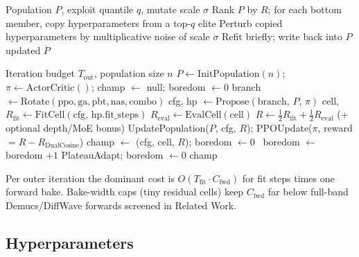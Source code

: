 \begin{algorithm}[t]
\caption{PBT exploit--mutate}
\label{alg:pbt}
\begin{algorithmic}[1]
\Require Population $P$, exploit quantile $q$, mutate scale $\sigma$
\State Rank $P$ by $R$; for each bottom member, copy hyperparameters from a top-$q$ elite
\State Perturb copied hyperparameters by multiplicative noise of scale $\sigma$
\State Refit briefly; write back into $P$
\State \Return updated $P$
\end{algorithmic}
\end{algorithm}

\begin{algorithm}[t]
\caption{HybridMetaSearch}
\label{alg:hybrid}
\begin{algorithmic}[1]
\Require Iteration budget $T_{\mathrm{out}}$, population size $n$
\State $P \gets \mathrm{InitPopulation}(n)$; $\pi \gets \mathrm{ActorCritic}()$; champ $\gets$ null; boredom $\gets 0$
  \State branch $\gets \mathrm{Rotate}(\mathrm{ppo},\mathrm{ga},\mathrm{pbt},\mathrm{nas},\mathrm{combo})$
  \State cfg, hp $\gets \mathrm{Propose}(\mathrm{branch},\,P,\,\pi)$
  \State cell, $R_{\mathrm{fit}} \gets \mathrm{FitCell}(\mathrm{cfg},\,\mathrm{hp.fit\_steps})$
  \State $R_{\mathrm{eval}} \gets \mathrm{EvalCell}(\mathrm{cell})$
  \State $R \gets \tfrac12 R_{\mathrm{fit}} + \tfrac12 R_{\mathrm{eval}}$ (+ optional depth/MoE bonus)
  \State UpdatePopulation($P$, cfg, $R$); PPOUpdate($\pi$, reward $= R - R_{\mathrm{DualCosine}}$)
   champ $\gets$ (cfg, cell, $R$); boredom $\gets 0$
  \Else\ boredom $\gets$ boredom $+1$
  \EndIf
   PlateauAdapt; boredom $\gets 0$
  \EndIf
\EndFor
\State \Return champ
\end{algorithmic}
\end{algorithm}

\begin{remark}
\label{rem:complexity}
Per outer iteration the dominant cost is $O(T_{\mathrm{fit}}\cdot C_{\mathrm{fwd}})$ for fit steps times one forward bake.
Bake-width caps (tiny residual cells) keep $C_{\mathrm{fwd}}$ far below full-band Demucs/DiffWave forwards screened in Related Work.
\end{remark}



\subsection{Hyperparameters}
\label{sec:hyperparams}

